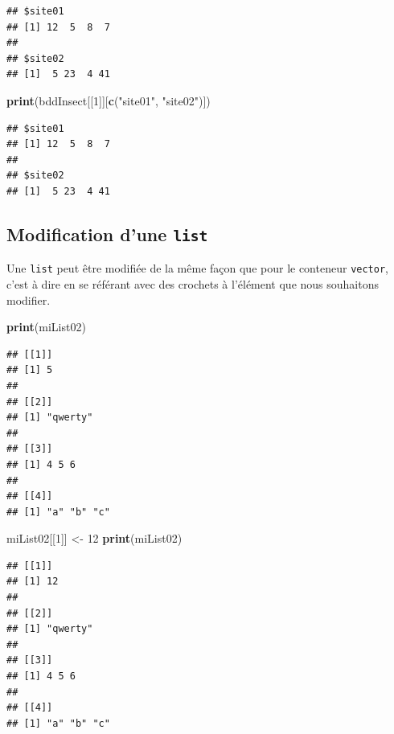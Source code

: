\documentclass[
]{book}
\newenvironment{Shaded}{\begin{snugshade}}{\end{snugshade}}
\newcommand{\DecValTok}[1]{\textcolor[rgb]{0.00,0.00,0.81}{#1}}
\newcommand{\KeywordTok}[1]{\textcolor[rgb]{0.13,0.29,0.53}{\textbf{#1}}}
\newcommand{\NormalTok}[1]{#1}
\newcommand{\StringTok}[1]{\textcolor[rgb]{0.31,0.60,0.02}{#1}}
\begin{document}
\begin{verbatim}
## $site01
## [1] 12  5  8  7
## 
## $site02
## [1]  5 23  4 41
\end{verbatim}

\begin{Shaded}
\begin{Highlighting}[]
\KeywordTok{print}\NormalTok{(bddInsect[[}\DecValTok{1}\NormalTok{]][}\KeywordTok{c}\NormalTok{(}\StringTok{"site01"}\NormalTok{, }\StringTok{"site02"}\NormalTok{)])}
\end{Highlighting}
\end{Shaded}

\begin{verbatim}
## $site01
## [1] 12  5  8  7
## 
## $site02
## [1]  5 23  4 41
\end{verbatim}

\hypertarget{modification-dune-list}{%
\subsection{\texorpdfstring{Modification d'une \texttt{list}}{Modification d'une list}}\label{modification-dune-list}}

Une \texttt{list} peut être modifiée de la même façon que pour le conteneur \texttt{vector}, c'est à dire en se référant avec des crochets à l'élément que nous souhaitons modifier.

\begin{Shaded}
\begin{Highlighting}[]
\KeywordTok{print}\NormalTok{(miList02)}
\end{Highlighting}
\end{Shaded}

\begin{verbatim}
## [[1]]
## [1] 5
## 
## [[2]]
## [1] "qwerty"
## 
## [[3]]
## [1] 4 5 6
## 
## [[4]]
## [1] "a" "b" "c"
\end{verbatim}

\begin{Shaded}
\begin{Highlighting}[]
\NormalTok{miList02[[}\DecValTok{1}\NormalTok{]] <-}\StringTok{ }\DecValTok{12}
\KeywordTok{print}\NormalTok{(miList02)}
\end{Highlighting}
\end{Shaded}

\begin{verbatim}
## [[1]]
## [1] 12
## 
## [[2]]
## [1] "qwerty"
## 
## [[3]]
## [1] 4 5 6
## 
## [[4]]
## [1] "a" "b" "c"
\end{verbatim}
\end{document}
